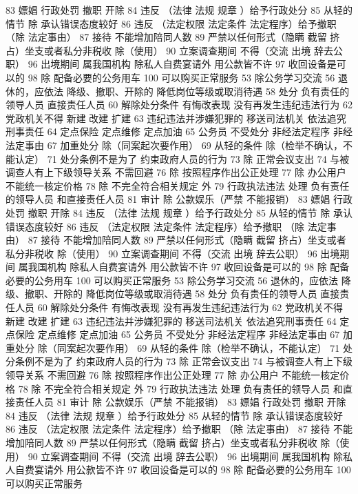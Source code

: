 \documentclass[cyan]{elegantnote}
\begin{document}
83 嫖娼 行政处罚
撤职 开除
84 违反 （法律 法规 规章 ）给予行政处分
85 从轻的情节
除 承认错误态度较好
86 违反 （法定权限 法定条件 法定程序）给予撤职
（除 法定事由）
87 接待 不能增加陪同人数
89 严禁以任何形式（隐瞒 截留 挤占）坐支或者私分非税收
除（使用）
90 立案调查期间 不得（交流 出境 辞去公职）
96 出境期间 属我国机构 除私人自费宴请外 用公款皆不许
97 收回设备是可以的
98 除 配备必要的公务用车
100 可以购买正常服务
53 除公务学习交流
56 退休的，应依法
降级、撤职、开除的 降低岗位等级或取消待遇
58 处分
负有责任的领导人员
直接责任人员
60 解除处分条件
有悔改表现
没有再发生违纪违法行为
62 党政机关不得
新建 改建 扩建
63 违纪违法并涉嫌犯罪的
移送司法机关
依法追究刑事责任
64 定点保险 定点维修 定点加油
65 公务员 不受处分
非经法定程序
非经法定事由
67 加重处分
除（同案起次要作用）
69 从轻的条件
除（检举不确认，不能认定）
71 处分条例不是为了
约束政府人员的行为
73 除 正常会议支出
74 与被调查人有上下级领导关系 不需回避
76 除 按照程序作出公正处理
77 除 办公用户
不能统一核定价格
78 除 不完全符合相关规定 外
79 行政执法违法 处理
负有责任的领导人员
和直接责任人员
81 审计
除 公款娱乐（严禁 不能报销）
83 嫖娼 行政处罚
撤职 开除
84 违反 （法律 法规 规章 ）给予行政处分
85 从轻的情节
除 承认错误态度较好
86 违反 （法定权限 法定条件 法定程序）给予撤职
（除 法定事由）
87 接待 不能增加陪同人数
89 严禁以任何形式（隐瞒 截留 挤占）坐支或者私分非税收
除（使用）
90 立案调查期间 不得（交流 出境 辞去公职）
96 出境期间 属我国机构 除私人自费宴请外 用公款皆不许
97 收回设备是可以的
98 除 配备必要的公务用车
100 可以购买正常服务
53 除公务学习交流
56 退休的，应依法
降级、撤职、开除的 降低岗位等级或取消待遇
58 处分
负有责任的领导人员
直接责任人员
60 解除处分条件
有悔改表现
没有再发生违纪违法行为
62 党政机关不得
新建 改建 扩建
63 违纪违法并涉嫌犯罪的
移送司法机关
依法追究刑事责任
64 定点保险 定点维修 定点加油
65 公务员 不受处分
非经法定程序
非经法定事由
67 加重处分
除（同案起次要作用）
69 从轻的条件
除（检举不确认，不能认定）
71 处分条例不是为了
约束政府人员的行为
73 除 正常会议支出
74 与被调查人有上下级领导关系 不需回避
76 除 按照程序作出公正处理
77 除 办公用户
不能统一核定价格
78 除 不完全符合相关规定 外
79 行政执法违法 处理
负有责任的领导人员
和直接责任人员
81 审计
除 公款娱乐（严禁 不能报销）
83 嫖娼 行政处罚
撤职 开除
84 违反 （法律 法规 规章 ）给予行政处分
85 从轻的情节
除 承认错误态度较好
86 违反 （法定权限 法定条件 法定程序）给予撤职
（除 法定事由）
87 接待 不能增加陪同人数
89 严禁以任何形式（隐瞒 截留 挤占）坐支或者私分非税收
除（使用）
90 立案调查期间 不得（交流 出境 辞去公职）
96 出境期间 属我国机构 除私人自费宴请外 用公款皆不许
97 收回设备是可以的
98 除 配备必要的公务用车
100 可以购买正常服务
\end{document}
